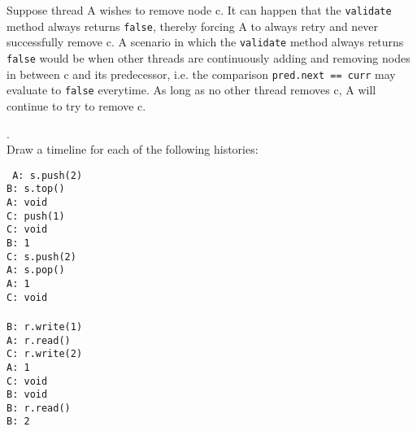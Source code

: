 \documentclass[main]{subfiles}
\begin{document}
\begin{ExerciseList}
            \Question Suppose thread A wishes to remove node c. It can happen that the \texttt{validate} method always returns \texttt{false}, thereby forcing A to always retry and never successfully remove c. A scenario in which the \texttt{validate} method always returns \texttt{false} would be when other threads are continuously adding and removing nodes in between c and its predecessor, i.e. the comparison \texttt{pred.next == curr} may evaluate to \texttt{false} everytime. As long as no other thread removes c, A will continue to try to remove c.

        
        \Exercise[title={Linearizability and Sequential Consistency},label=LSC].\quad \\
            \Question Draw a timeline for each of the following histories: \\
                \vspace{-10pt}
                \begin{multicols*}{3}
                    \texttt{
                        \noindent A: s.push(2)\\
                        B: s.top() \\
                        A: void \\
                        C: push(1) \\
                        C: void \\
                        B: 1 \\
                        C: s.push(2) \\
                        A: s.pop() \\
                        A: 1 \\
                        C: void \\
                        \columnbreak
                         \\
                        B: r.write(1) \\
                        A: r.read() \\
                        C: r.write(2) \\
                        A: 1 \\
                        C: void \\
                        B: void \\
                        B: r.read() \\
                        B: 2 \\
                        \columnbreak
                         \\
}
\end{multicols*}
\end{ExerciseList}
\end{document}
